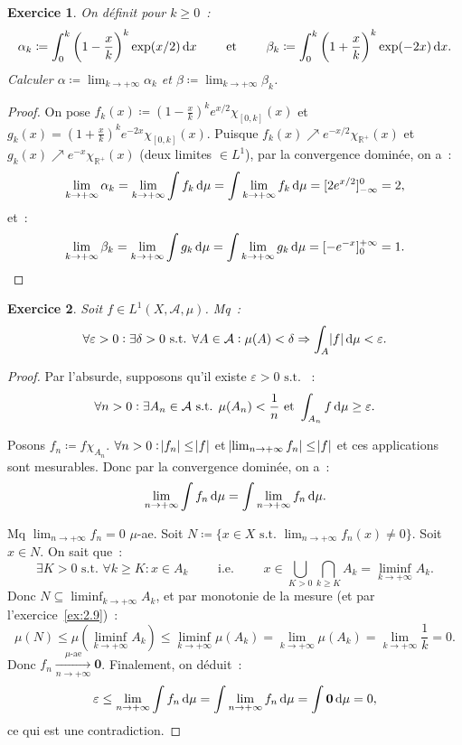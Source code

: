 \documentclass{article}
\newtheorem{ex}{Exercice}[section]
\newcommand{\pinfty}{{+\infty}}
\newcommand{\minfty}{{-\infty}}
\newcommand{\st}{\text{ s.t. }}
\newcommand{\R}{{\mathbb R}}
\begin{document}
\begin{ex} On définit pour $k \geq 0$~:
\[\alpha_k \coloneqq \int_0^k\left(1 - \frac xk\right)^k\exp(x/2)\dif x \qquad \text{ et } \qquad \beta_k \coloneqq \int_0^k\left(1 + \frac xk\right)^k\exp(-2x)\dif x.\]
Calculer $\alpha \coloneqq \lim_{k \to \pinfty}\alpha_k$ et $\beta \coloneqq \lim_{k \to \pinfty} \beta_k$.
\end{ex}

\begin{proof} On pose $f_k(x) \coloneqq \left(1-\frac xk\right)^ke^{x/2}\chi_{[0, k]}(x)$ et $g_k(x) = \left(1+\frac xk\right)^ke^{-2x}\chi_{[0, k]}(x)$.
Puisque $f_k(x) \nearrow e^{-x/2}\chi_{\R^+}(x)$ et $g_k(x) \nearrow e^{-x}\chi_{\R^+}(x)$ (deux limites $\in L^1$), par la convergence dominée, on a~:
\[\lim_{k \to \pinfty} \alpha_k = \lim_{k \to \pinfty}\int f_k\dif\mu = \int\lim_{k \to \pinfty}f_k\dif\mu = [2e^{x/2}]_{\minfty}^0 = 2,\]
et~:
\[\lim_{k \to \pinfty}\beta_k = \lim_{k \to \pinfty}\int g_k\dif\mu = \int\lim_{k \to \pinfty}g_k\dif\mu = [-e^{-x}]_0^\pinfty = 1.\]
\end{proof}

\begin{ex}\label{ex:6.6} Soit $f \in L^1(X, \mathcal A, \mu)$. Mq~:
\[\forall \varepsilon > 0 : \exists \delta > 0 \st \forall A \in \mathcal A : \mu(A) < \delta \Rightarrow \int_A\abs f\dif\mu < \varepsilon.\]
\end{ex}

\begin{proof} Par l'absurde, supposons qu'il existe $\varepsilon > 0 \st$~:
\[\forall n > 0 : \exists A_n \in \mathcal A \st \mu(A_n) < \frac 1n \text{ et } \int_{A_n}f\dif \mu \geq \varepsilon.\]

Posons $f_n \coloneqq f\chi_{A_n}$. $\forall n > 0 : \abs {f_n} \leq \abs f$ et $\abs {\lim_{n \to \pinfty}f_n} \leq \abs f$ et ces applications sont mesurables. Donc par
la convergence dominée, on a~:
\[\lim_{n \to \pinfty}\int f_n\dif\mu = \int\lim_{n \to \pinfty}f_n\dif \mu.\]

Mq $\lim_{n \to \pinfty}f_n = 0$ $\mu$-ae. Soit $N \coloneqq \{x \in X \st \lim_{n \to \pinfty}f_n(x) \neq 0\}$. Soit $x \in N$. On sait que~:
\[\exists K > 0 \st \forall k \geq K : x \in A_k \qquad\text{ i.e. }\qquad x \in \bigcup_{K > 0}\bigcap_{k \geq K}A_k = \liminf_{k \to \pinfty}A_k.\]
Donc $N \subseteq \liminf_{k \to \pinfty}A_k$, et par monotonie de la mesure (et par l'exercice~\ref{ex:2.9})~:
\[\mu(N) \leq \mu\left(\liminf_{k \to \pinfty}A_k\right) \leq \liminf_{k \to \pinfty}\mu(A_k) = \lim_{k \to \pinfty}\mu(A_k) = \lim_{k \to \pinfty} \frac 1k = 0.\]
Donc $f_n \xrightarrow[n \to \pinfty]{\mu\text{-ae}} \mathbf 0$. Finalement, on déduit~:
\[\varepsilon \leq \lim_{n \to \pinfty}\int f_n\dif \mu = \int\lim_{n \to \pinfty}f_n\dif \mu = \int\mathbf 0\dif\mu = 0,\]
ce qui est une contradiction.
\end{proof}
\end{document}
